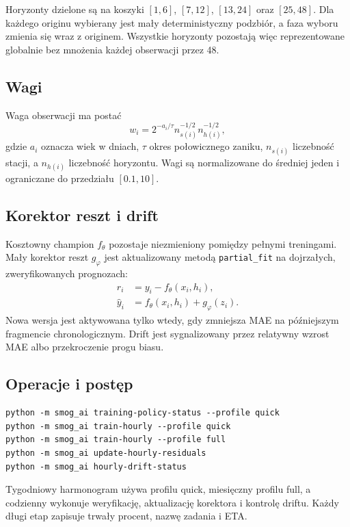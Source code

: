 \documentclass[11pt,a4paper,oneside]{article}
\begin{document}
Horyzonty dzielone są na koszyki $[1,6]$, $[7,12]$, $[13,24]$ oraz
$[25,48]$. Dla każdego originu wybierany jest mały deterministyczny podzbiór,
a faza wyboru zmienia się wraz z originem. Wszystkie horyzonty pozostają więc
reprezentowane globalnie bez mnożenia każdej obserwacji przez 48.

\subsection{Wagi}

Waga obserwacji ma postać
\begin{equation}
 w_i = 2^{-a_i/\tau}
       n_{s(i)}^{-1/2}
       n_{h(i)}^{-1/2},
\end{equation}
gdzie $a_i$ oznacza wiek w dniach, $\tau$ okres połowicznego zaniku,
$n_{s(i)}$ liczebność stacji, a $n_{h(i)}$ liczebność horyzontu. Wagi są
normalizowane do średniej jeden i ograniczane do przedziału $[0.1,10]$.

\subsection{Korektor reszt i drift}

Kosztowny champion $f_\theta$ pozostaje niezmieniony pomiędzy pełnymi
treningami. Mały korektor reszt $g_\varphi$ jest aktualizowany metodą
\texttt{partial\_fit} na dojrzałych, zweryfikowanych prognozach:
\begin{align}
 r_i &= y_i-f_\theta(x_i,h_i),\\
 \widehat y_i &= f_\theta(x_i,h_i)+g_\varphi(z_i).
\end{align}
Nowa wersja jest aktywowana tylko wtedy, gdy zmniejsza MAE na późniejszym
fragmencie chronologicznym. Drift jest sygnalizowany przez relatywny wzrost
MAE albo przekroczenie progu biasu.

\subsection{Operacje i postęp}

\begin{lstlisting}[style=code]
python -m smog_ai training-policy-status --profile quick
python -m smog_ai train-hourly --profile quick
python -m smog_ai train-hourly --profile full
python -m smog_ai update-hourly-residuals
python -m smog_ai hourly-drift-status
\end{lstlisting}

Tygodniowy harmonogram używa profilu quick, miesięczny profilu full, a
codzienny wykonuje weryfikację, aktualizację korektora i kontrolę driftu.
Każdy długi etap zapisuje trwały procent, nazwę zadania i ETA.
\end{document}

